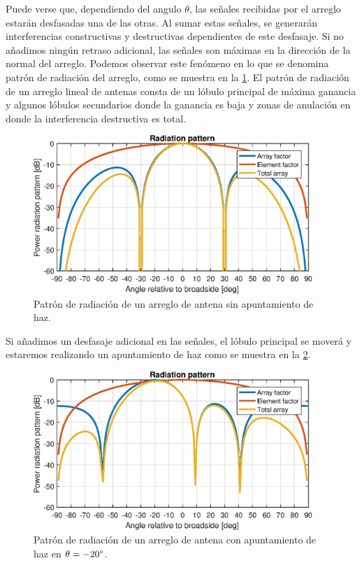\documentclass{article}
\newenvironment{standalone}{\begin{preview}}{\end{preview}}
\begin{document}
\begin{standalone}
  Puede verse que, dependiendo del angulo $\theta$, las señales recibidas por el arreglo estarán desfasadas una de las otras.
  Al sumar estas señales, se generarán interferencias constructivas y destructivas dependientes de este desfasaje.
  Si no añadimos ningún retraso adicional, las señales son máximas en la dirección de la normal del arreglo.
  Podemos observar este fenómeno en lo que se denomina patrón de radiación del arreglo, como se muestra en la \cref{fig:patron-radiacion-sin-apuntamiento}.
  El patrón de radiación de un arreglo lineal de antenas consta de un lóbulo principal de máxima ganancia y algunos lóbulos secundarios donde la ganancia es baja y zonas de anulación en donde la interferencia destructiva es total.

  \begin{figure}[!htbp]
    \centering
    \includegraphics[width=\linewidth, height=60mm, keepaspectratio]{../images/radiation-pattern-broadside.eps}
    \caption{Patrón de radiación de un arreglo de antena sin apuntamiento de haz.}
    \label{fig:patron-radiacion-sin-apuntamiento}
  \end{figure}

  Si añadimos un desfasaje adicional en las señales, el lóbulo principal se moverá y estaremos realizando un apuntamiento de haz como se muestra en la \cref{fig:patron-radiacion-con-apuntamiento}.

  \begin{figure}[!htbp]
    \centering
    \includegraphics[width=\linewidth, height=60mm, keepaspectratio]{../images/radiation-pattern-beamforming.eps}
    \caption{Patrón de radiación de un arreglo de antena con apuntamiento de haz en $\theta = -20\degree$.}
    \label{fig:patron-radiacion-con-apuntamiento}
  \end{figure}


\end{standalone}
\end{document}
